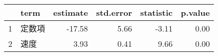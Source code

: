 \begin{tabular}{rlrrrr}
  \hline
 & term & estimate & std.error & statistic & p.value \\ 
  \hline
1 & 定数項 & -17.58 & 5.66 & -3.11 & 0.00 \\ 
  2 & 速度 & 3.93 & 0.41 & 9.66 & 0.00 \\ 
   \hline
\end{tabular}

